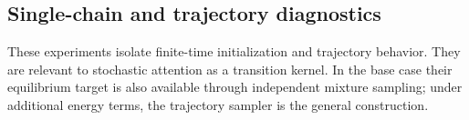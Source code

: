 \subsection{Single-chain and trajectory diagnostics}
These experiments isolate finite-time initialization and trajectory behavior.
They are relevant to stochastic attention as a transition kernel. In the base
case their equilibrium target is also available through independent mixture
sampling; under additional energy terms, the trajectory sampler is the general
construction.
\begin{table}[ht]
\centering
\caption{Single-chain and multi-chain endpoint statistics for digit 3
($K=100$, $d=784$, $\alpha=0.01$). The comparison separates variation caused
by allocating warm starts across memories from variation along one finite-time
trajectory.}
\label{tab:single-chain}
\small
\setlength{\tabcolsep}{4pt}
\end{table}

